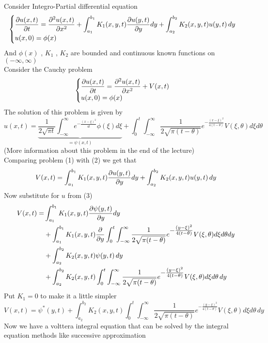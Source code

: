 \documentclass[]{article}
\begin{document}
\begin{example}
    Consider Integro-Partial differential equation
    \begin{equation}
        \begin{cases}
                \displaystyle \pdv{u(x,t)}{t}=\pdv[2]{u(x,t)}{x} + \int_{a_1}^{b_1} K_1(x,y,t) \pdv{u(y,t)}{y} dy + \int_{a_2}^{b_2}K_2(x,y,t)u(y,t) \, dy
                \\
                u(x,0)=\phi(x)
        \end{cases}
    \end{equation}
    And $\phi(x)$ , $K_1$ , $K_2$ are bounded and continuous known functions on $(-\infty,\infty)$
    \\
    Consider the Cauchy problem 
    \begin{equation}
        \begin{cases}
                \displaystyle \pdv{u(x,t)}{t}=\pdv[2]{u(x,t)}{x} + V(x,t)
                \\
                u(x,0)=\phi(x)
        \end{cases}
    \end{equation}
    The solution of this problem is given by 
    \begin{equation}
        u(x,t) = \underbrace{\frac{1}{2\sqrt{\pi t}}\int_{-\infty}^{\infty}e^{\textstyle -\frac{{(x-\xi)}^2}{4t}} \phi(\xi)d\xi}_{= \psi(x,t)} 
    + \int_{0}^{t} \int_{-\infty}^{\infty}\frac{1}{2\sqrt{\pi (t-\theta)}} e^{\textstyle -\frac{{(x-\xi)}^2}{4(t-\theta)}} V(\xi,\theta)d\xi d\theta
    \end{equation}
    (More information about this problem in the end of the lecture)
    \\
    Comparing problem (1) with (2) we get that  
    \[
        V(x,t) = \int_{a_1}^{b_1} K_1(x,y,t) \pdv{u(y,t)}{y} dy + \int_{a_2}^{b_2}K_2(x,y,t)u(y,t) \, dy
    \]
    Now substitute for $u$ from (3)
    \begin{align*}
        V(x,t) =& \int_{a_1}^{b_1} K_1(x,y,t) \pdv{\psi(y,t)}{y} dy 
                \\
                &+ \int_{a_1}^{b_1} K_1(x,y,t) \pdv{}{y} \int_{0}^{t} \int_{-\infty}^{\infty}\frac{1}{2\sqrt{\pi (t-\theta)}} e^{\textstyle -\frac{{(y-\xi)}^2}{4(t-\theta)}} V(\xi,\theta)d\xi d\theta dy 
                \\
                &+ \int_{a_2}^{b_2}K_2(x,y,t) \psi(y,t) \, dy
                \\
                &+ \int_{a_2}^{b_2}K_2(x,y,t) \int_{0}^{t} \int_{-\infty}^{\infty}\frac{1}{2\sqrt{\pi (t-\theta)}} e^{\textstyle -\frac{{(y-\xi)}^2}{4(t-\theta)}} V(\xi,\theta)d\xi d\theta \, dy
    \end{align*}
    Put $K_1 = 0 $ to make it a little simpler
    \[
        V(x,t) = \psi^*(y,t) + \int_{a_2}^{b_2}K_2(x,y,t) \int_{0}^{t} \int_{-\infty}^{\infty}\frac{1}{2\sqrt{\pi (t-\theta)}} e^{\textstyle -\frac{{(y-\xi)}^2}{4(t-\theta)}} V(\xi,\theta)d\xi d\theta \, dy    
    \]
    Now we have a volttera integral equation that can be solved by the integral equation methods like successive approximation
\end{example}
\end{document}
